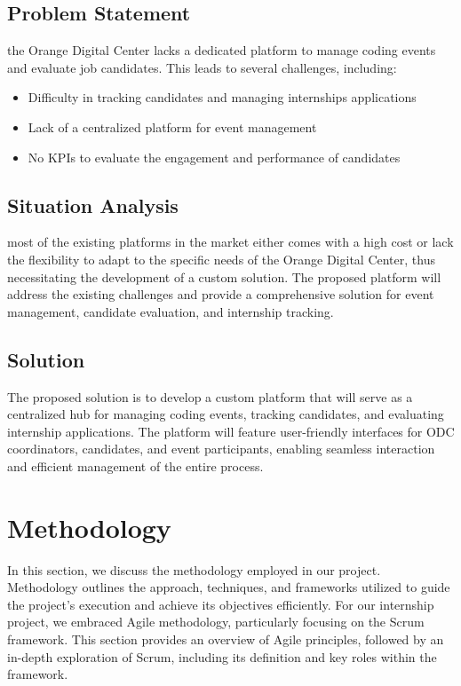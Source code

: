 \subsection{Problem Statement}
the Orange Digital Center lacks a dedicated platform to manage coding
events and evaluate job candidates. This leads to several challenges, including:

\begin{itemize}
      \item Difficulty in tracking candidates and managing internships
            applications
      \item Lack of a centralized platform for event management
      \item No KPIs to evaluate the engagement and performance of candidates
\end{itemize}

\subsection{Situation Analysis}
most of the existing platforms in the market either comes with a high cost or
lack the flexibility to adapt to the specific needs of the Orange Digital
Center, thus
necessitating the development of a custom solution. The proposed platform will
address the existing challenges and provide a comprehensive solution for event
management, candidate evaluation, and internship tracking.

\subsection{Solution}
The proposed solution is to develop a custom platform that will serve as a
centralized hub for managing coding events, tracking candidates, and evaluating
internship applications. The platform will feature user-friendly interfaces for
ODC coordinators, candidates, and event participants, enabling seamless
interaction and efficient management of the entire process.

\section{Methodology}
In this section, we discuss the methodology employed in our project.
Methodology outlines the approach, techniques, and frameworks utilized to guide
the project's execution and achieve its objectives efficiently. For our
internship project, we embraced Agile methodology, particularly focusing on the
Scrum framework. This section provides an overview of Agile principles,
followed by an in-depth exploration of Scrum, including its definition and key
roles within the framework.

